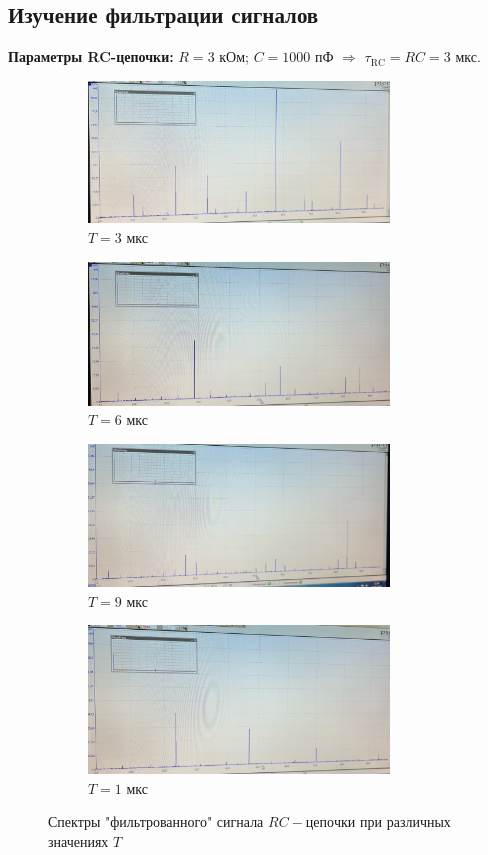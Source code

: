 \subsection*{Изучение фильтрации сигналов}
\textbf{Параметры RC-цепочки:} $R = 3$ кОм; $C = 1000$ пФ $\Rightarrow$ $\tau_{\text{RC}} = RC = 3$ мкс.

\begin{figure}[h!]
    \centering
    \begin{subfigure}[b]{0.48\linewidth}
        \centering
        \includegraphics[width=8cm]{./images/T_x.jpg}
        \caption{$T = 3$ мкс}
    \end{subfigure}
    \hfill
    \begin{subfigure}[b]{0.48\linewidth}
        \centering
        \includegraphics[width=8cm]{./images/T_6.jpg}
        \caption{$T = 6$ мкс}
    \end{subfigure}
    \vfill
    \begin{subfigure}[b]{0.48\linewidth}
        \centering
        \includegraphics[width=8cm]{./images/T_9.jpg}
        \caption{$T = 9$ мкс}
    \end{subfigure}
    \hfill
    \begin{subfigure}[b]{0.48\linewidth}
        \centering
        \includegraphics[width=8cm]{./images/T_1.jpg}
        \caption{$T = 1$ мкс}
    \end{subfigure}
    \caption{Спектры "фильтрованного" сигнала $RC-цепочки$ при различных значениях $T$}
\end{figure}

